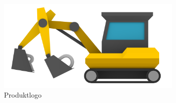 \documentclass[parskip=full]{scrartcl}
\begin{document}
\vspace{1cm}
\begin{figure}[!h]
\centering
\includegraphics[width=0.8\textwidth]{../Plichtenheft/logo_nongi.png}
\caption{Produktlogo}
\end{figure}

\newpage
\end{document}
